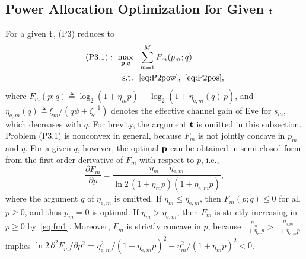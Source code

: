 \documentclass[journal]{IEEEtran}
\begin{document}
\subsection{Power Allocation Optimization for Given $\mathbf{t}$}\label{sec:power}

For a given $\mathbf{t}$, (P3) reduces to
\begin{subequations}\label{eq:P31}
\begin{align}
(\mathrm{P3.1}):\ \max_{\mathbf{p},q}\ \ & \sum_{m=1}^{M}F_m(p_m;q)\\
\mathrm{s.t.}\ \ & \eqref{eq:P2pow},\ \eqref{eq:P2pos},\nonumber
\end{align}
\end{subequations}
where $F_m(p;q)\triangleq\log_2(1+\eta_mp)-\log_2(1+\eta_{\mathrm{e},m}(q)\,p)$, and $\eta_{\mathrm{e},m}(q)\triangleq\xi_m/(q\psi+\zeta_{\mathrm e}^{-1})$ denotes the effective channel gain of Eve for $s_m$, which decreases with $q$. For brevity, the argument $\mathbf{t}$ is omitted in this subsection. Problem (P3.1) is nonconvex in general, because $F_m$ is not jointly concave in $p_m$ and $q$. For a given $q$, however, the optimal $\mathbf{p}$ can be obtained in semi-closed form from the first-order derivative of $F_m$ with respect to $p$, i.e.,
\begin{equation}\label{eq:fm1}
\frac{\partial F_m}{\partial p}=\frac{\eta_m-\eta_{\mathrm{e},m}}{\ln2\,(1+\eta_mp)(1+\eta_{\mathrm{e},m}p)},
\end{equation}
where the argument $q$ of $\eta_{\mathrm{e},m}$ is omitted. If $\eta_m\le\eta_{\mathrm{e},m}$, then $F_m(p;q)\le0$ for all $p\ge0$, and thus $p_m=0$ is optimal. If $\eta_m>\eta_{\mathrm{e},m}$, then $F_m$ is strictly increasing in $p\ge0$ by~\eqref{eq:fm1}. Moreover, $F_m$ is strictly concave in $p$, because $\frac{\eta_m}{1+\eta_mp}>\frac{\eta_{\mathrm{e},m}}{1+\eta_{\mathrm{e},m}p}$ implies $\ln2\,\partial^2F_m/\partial p^2=\eta_{\mathrm{e},m}^2/(1+\eta_{\mathrm{e},m}p)^2-\eta_m^2/(1+\eta_mp)^2<0$.
\end{document}
